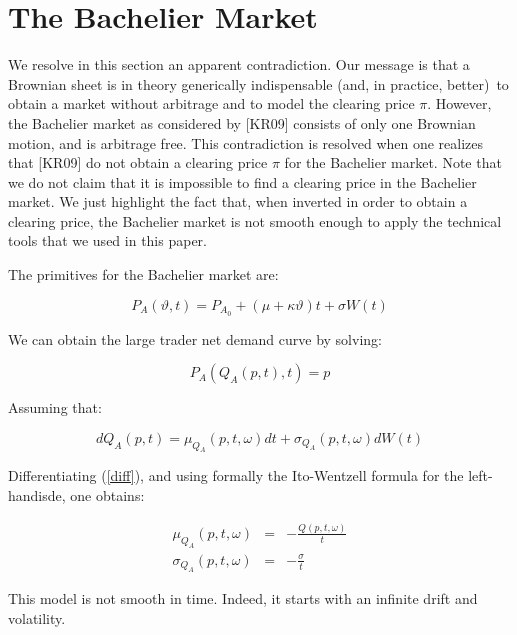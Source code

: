 \documentclass{article}
\begin{document}
\bigskip

\section{The Bachelier Market}

We resolve in this section an apparent contradiction. Our message is that a
Brownian sheet is in theory generically indispensable (and, in practice,
better)\ to obtain a market without arbitrage and to model the clearing
price $\pi $. However, the Bachelier market as considered by [KR09] consists
of only one Brownian motion, and is arbitrage free. This contradiction is
resolved when one realizes that [KR09] do not obtain a clearing price $\pi $
for the Bachelier market. Note that we do not claim that it is impossible to
find a clearing price in the Bachelier market. We just highlight the fact
that, when inverted in order to obtain a clearing price, the Bachelier
market is not smooth enough to apply the technical tools that we used in
this paper.

\bigskip

The primitives for the Bachelier market are:

\begin{equation*}
P_{A}(\vartheta ,t)=P_{A_{0}}+\left( \mu +\kappa \vartheta \right) t+\sigma
W(t)
\end{equation*}

We can obtain the large trader net demand curve by solving:

\begin{equation}
P_{A}(Q_{A}(p,t),t)=p  \label{diff}
\end{equation}

Assuming that:

\begin{equation*}
dQ_{A}(p,t)=\mu _{Q_{A}}(p,t,\omega )dt+\sigma _{Q_{A}}(p,t,\omega )dW(t)
\end{equation*}

Differentiating (\ref{diff}), and using formally the Ito-Wentzell formula
for the left-handisde, one obtains:

\begin{eqnarray*}
\mu _{Q_{A}}(p,t,\omega ) &=&-\frac{Q(p,t,\omega )}{t} \\
\sigma _{Q_{A}}(p,t,\omega ) &=&-\frac{\sigma }{t}
\end{eqnarray*}

This model is not smooth in time. Indeed, it starts with an infinite drift
and volatility.
\end{document}
